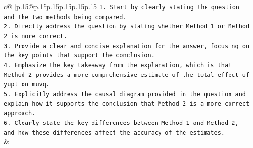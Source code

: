 \documentclass{article}
\begin{document}
{\begin{supertabular}{c@{$\;$}|p{.15\linewidth}@{}p{.15\linewidth}p{.15\linewidth}p{.15\linewidth}p{.15\linewidth}p{.15\linewidth}}
{{{\texttt{1. Start by clearly stating the question and the two methods being compared.} \\
\texttt{2. Directly address the question by stating whether Method 1 or Method 2 is more correct.} \\
\texttt{3. Provide a clear and concise explanation for the answer, focusing on the key points that support the conclusion.} \\
\texttt{4. Emphasize the key takeaway from the explanation, which is that Method 2 provides a more comprehensive estimate of the total effect of yupt on muvq.} \\
\texttt{5. Explicitly address the causal diagram provided in the question and explain how it supports the conclusion that Method 2 is a more correct approach.} \\
\texttt{6. Clearly state the key differences between Method 1 and Method 2, and how these differences affect the accuracy of the estimates.} \\
            }
        }
    }
    & \\ \\

\end{supertabular}
}
\end{document}
